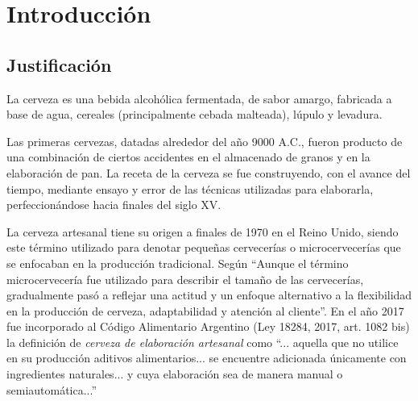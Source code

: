 \chapter{Introducción}
\section{Justificación}
    \par
    La cerveza es una bebida alcohólica fermentada, de sabor amargo, fabricada a base de agua, cereales (principalmente cebada malteada), lúpulo y levadura.
    \par
    Las primeras cervezas, datadas alrededor del año 9000 A.C., fueron producto de una combinación de ciertos accidentes en el almacenado de granos y en la elaboración de pan. La receta de la cerveza se fue construyendo, con el avance del tiempo, mediante ensayo y error de las técnicas utilizadas para elaborarla, perfeccionándose hacia finales del siglo XV.
    \par
    La cerveza artesanal tiene su origen a finales de 1970 en el Reino Unido, siendo este término utilizado para denotar pequeñas cervecerías o microcervecerías que se enfocaban en la producción tradicional. Según \cite{Calvillo17} “Aunque el término microcervecería fue utilizado para describir el tamaño de las cervecerías, gradualmente pasó a reflejar una actitud y un enfoque alternativo a la flexibilidad en la producción de cerveza, adaptabilidad y atención al cliente”. En el año 2017 fue incorporado al Código Alimentario Argentino (Ley 18284, 2017, art. 1082 bis) la definición de \textit{cerveza de elaboración artesanal} como “... aquella que no utilice en su producción aditivos alimentarios... se encuentre adicionada únicamente con ingredientes naturales... y cuya elaboración sea de manera manual o semiautomática...”
    
    

